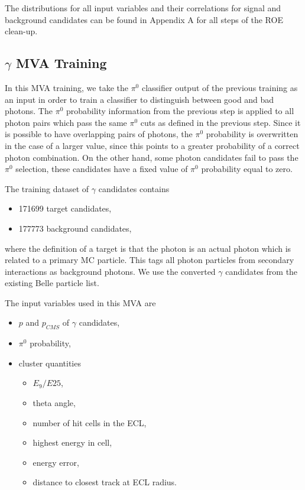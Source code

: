 The distributions for all input variables and their correlations for signal and background candidates can be found in Appendix A for all steps of the ROE clean-up.


\subsection{\texorpdfstring{$\gamma$}{γ} MVA Training}

In this MVA training, we take the $\pi^0$ classifier output of the previous training as an input in order to train a classifier to distinguish between good and bad photons. The $\pi^0$ probability information from the previous step is applied to all photon pairs which pass the same $\pi^0$ cuts as defined in the previous step. Since it is possible to have overlapping pairs of photons, the $\pi^0$ probability is overwritten in the case of a larger value, since this points to a greater probability of a correct photon combination. On the other hand, some photon candidates fail to pass the $\pi^0$ selection, these candidates have a fixed value of $\pi^0$ probability equal to zero.

The training dataset of $\gamma$ candidates contains
\begin{itemize}
	\item 171699 target candidates,
	\item 177773 background candidates,
\end{itemize}
where the definition of a target is that the photon is an actual photon which is related to a primary MC particle. This tags all photon particles from secondary interactions as background photons. We use the converted $\gamma$ candidates from the existing Belle particle list. 

The input variables used in this MVA are
\begin{itemize}
	\item $p$ and $p_{CMS}$ of $\gamma$ candidates,
	\item $\pi^0$ probability,
	\item cluster quantities
	\begin{itemize}
		\item $E_9/E{25}$,
		\item theta angle,
		\item number of hit cells in the ECL,
		\item highest energy in cell,
		\item energy error,
		\item distance to closest track at ECL radius.
	\end{itemize}
\end{itemize}

